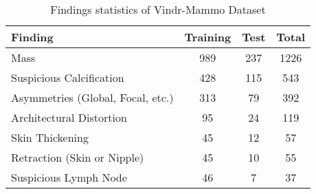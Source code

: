 \begin{table}[]
    \caption{Findings statistics of Vindr-Mammo Dataset}
    \label{tab:vindr-samples}
    \begin{tabular}{@{}l S[table-format=3]S[table-format=3]S[table-format=4]@{}}
    \toprule
    Finding                           & {Training} & {Test} & {Total} \\ \midrule
    Mass                              & 989      & 237  & 1226  \\
    Suspicious Calcification          & 428      & 115  & 543   \\
    Asymmetries (Global, Focal, etc.) & 313      & 79   & 392   \\
    Architectural Distortion          & 95       & 24   & 119   \\
    Skin Thickening                   & 45       & 12   & 57    \\
    Retraction (Skin or Nipple)       & 45       & 10   & 55    \\
    Suspicious Lymph Node             & 46       & 7    & 37    \\ \bottomrule
    \end{tabular}
    \end{table}